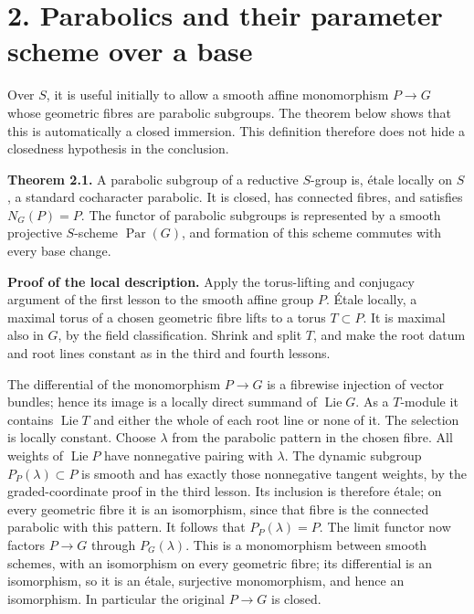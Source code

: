 \documentclass[11pt,a4paper,openany]{report}
\newcounter{none}
\begin{document}
\section{2. Parabolics and their parameter scheme over a base}\label{AG-RG-06-parabolics-and-their-parameter-scheme-over-a-base}

\begingroup{}
Over \(S\), it is useful initially to allow a smooth affine monomorphism \(P\to G\) whose geometric fibres are parabolic subgroups. The theorem below shows that this is automatically a closed immersion. This definition therefore does not hide a closedness hypothesis in the conclusion.
\par\endgroup

\textbf{Theorem 2.1.} A parabolic subgroup of a reductive \(S\)-group is, étale locally on \(S\), a standard cocharacter parabolic. It is closed, has connected fibres, and satisfies \(N_G(P)=P\). The functor of parabolic subgroups is represented by a smooth projective \(S\)-scheme \(\operatorname{Par}(G)\), and formation of this scheme commutes with every base change.

\textbf{Proof of the local description.} Apply the torus-lifting and conjugacy argument of the first lesson to the smooth affine group \(P\). Étale locally, a maximal torus of a chosen geometric fibre lifts to a torus \(T\subset P\). It is maximal also in \(G\), by the field classification. Shrink and split \(T\), and make the root datum and root lines constant as in the third and fourth lessons.

The differential of the monomorphism \(P\to G\) is a fibrewise injection of vector bundles; hence its image is a locally direct summand of \(\operatorname{Lie}G\). As a \(T\)-module it contains \(\operatorname{Lie}T\) and either the whole of each root line or none of it. The selection is locally constant. Choose \(\lambda\) from the parabolic pattern in the chosen fibre. All weights of \(\operatorname{Lie}P\) have nonnegative pairing with \(\lambda\). The dynamic subgroup \(P_P(\lambda)\subset P\) is smooth and has exactly those nonnegative tangent weights, by the graded-coordinate proof in the third lesson. Its inclusion is therefore étale; on every geometric fibre it is an isomorphism, since that fibre is the connected parabolic with this pattern. It follows that \(P_P(\lambda)=P\). The limit functor now factors \(P\to G\) through \(P_G(\lambda)\). This is a monomorphism between smooth schemes, with an isomorphism on every geometric fibre; its differential is an isomorphism, so it is an étale, surjective monomorphism, and hence an isomorphism. In particular the original \(P\to G\) is closed.
\end{document}
